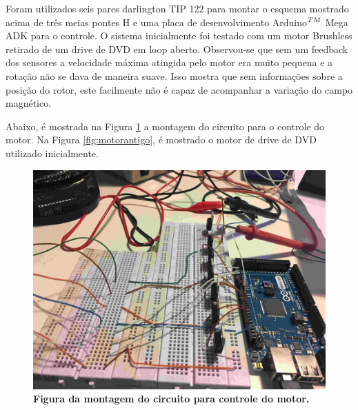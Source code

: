 \documentclass[10pt,fleqn,a4paper]{article}
\begin{document}
    Foram utilizados seis pares darlington TIP 122 para montar o esquema mostrado acima de três meias pontes H e uma placa de desenvolvimento Arduino$^{\small{TM}}$ Mega ADK para o controle. O sistema inicialmente foi testado com um motor Brushless retirado de um drive de DVD em loop aberto. Observou-se que sem um feedback dos sensores a velocidade máxima atingida pelo motor era muito pequena e a rotação não se dava de maneira suave. Isso mostra que sem informações sobre a posição do rotor, este facilmente não é capaz de acompanhar a variação do campo magnético.
    
    Abaixo, é mostrada na Figura \ref{fig:montagemcircuito} a montagem do circuito para o controle do motor. Na Figura \ref{fig:motorantigo}, é mostrado o motor de drive de DVD utilizado inicialmente.

	\begin{figure}[ht]
		\begin{center}
			\includegraphics[angle=0, scale=0.06]{images/montagemcircuito}
		\end{center}
		\caption{\textbf{Figura da montagem do circuito para controle do motor.}}
		\label{fig:montagemcircuito}
	\end{figure}
\end{document}
